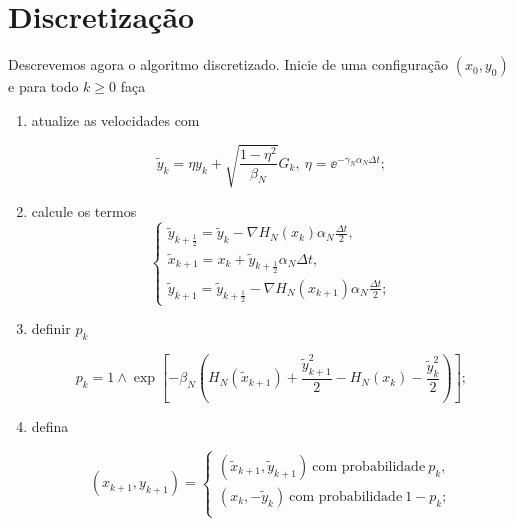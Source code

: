 \section{Discretização}

Descrevemos agora o algoritmo discretizado. Inicie de uma configuração $(x_0, y_0)$ e para todo $k \geq 0$ faça

\begin{enumerate}
	\item atualize as velocidades com
	
	\[
	\tilde{y}_k = \eta y_k + \sqrt{\frac{1-\eta^2}{\beta_N}} G_k, \ \eta = \ee^{-\gamma_N \alpha_N \Delta t};
	\]
	
	\item calcule os termos
	\[
	\begin{cases}
		\tilde{y}_{k+\frac{1}{2}} = \tilde{y}_k - \nabla H_N(x_k) \alpha_N \frac{\Delta t}{2}, \\
		\tilde{x}_{k+1} = x_k + \tilde{y}_{k + \frac{1}{2}} \alpha_N \Delta t, \\
		\tilde{y}_{k+1} = \tilde{y}_{k+\frac{1}{2}} - \nabla H_N(x_{k+1}) \alpha_N \frac{\Delta t}{2};
	\end{cases}
	\]
	
	\item definir $p_k$
	
	\[
	p_k = 1 \wedge \exp{\left[ -\beta_N \left(  H_N(\tilde{x}_{k+1}) + \frac{\tilde{y}^2_{k+1}}{2} - H_N(x_k) - \frac{\tilde{y}^2_k}{2} \right)\right] };
	\]
	
	\item defina
	
	\[
	(x_{k+1}, y_{k+1}) = 
	\begin{cases}
		(\tilde{x}_{k+1}, \tilde{y}_{k+1}) \ \text{com probabilidade} \ p_k, \\
		(x_k, -\tilde{y}_{k}) \ \text{com probabilidade} \ 1-p_k; \\
	\end{cases}
	\]
	
\end{enumerate}